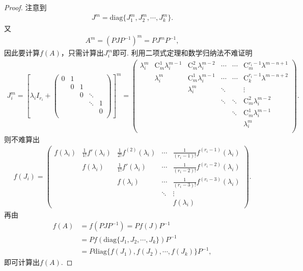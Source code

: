 \documentclass[../../main.tex]{subfiles}
\begin{document}
\begin{proof}
注意到
\begin{align*}
J^m = \mathrm{diag}\{J_1^m,J_2^m,\cdots,J_k^m\}.
\end{align*}
又
\begin{align*}
A^m = (PJP^{-1})^m = PJ^mP^{-1},
\end{align*}
因此要计算\(f(A)\)，只需计算出\(J_i^m\)即可. 
利用二项式定理和数学归纳法不难证明
\begin{align*}
J_{i}^{m}=\left[ \lambda _iI_{r_i}+\left( \begin{matrix}
0&		1&		&		&		\\
&		0&		1&		&		\\
&		&		0&		\ddots&		\\
&		&		&		\ddots&		1\\
&		&		&		&		0\\
\end{matrix} \right) \right] ^m=\left( \begin{matrix}
\lambda _{i}^{m}&		\mathrm{C}_{m}^{1}\lambda _{i}^{m-1}&		\mathrm{C}_{m}^{2}\lambda _{i}^{m-2}&		\cdots&		\cdots&		\mathrm{C}_{m}^{r_i-1}\lambda ^{m-n+1}\\
&		\lambda _{i}^{m}&		\mathrm{C}_{m}^{1}\lambda _{i}^{m-1}&		\cdots&		\cdots&		\mathrm{C}_{k}^{r_i-1}\lambda ^{m-n+2}\\
&		&		\lambda _{i}^{m}&		\ddots&		&		\vdots\\
&		&		&		\ddots&		\ddots&		\mathrm{C}_{m}^{2}\lambda _{i}^{m-2}\\
&		&		&		&		\ddots&		\mathrm{C}_{m}^{1}\lambda _{i}^{m-1}\\
&		&		&		&		&		\lambda _{i}^{m}\\
\end{matrix} \right) .
\end{align*}
则不难算出
\begin{align*}
f(J_i)= \begin{pmatrix}
f(\lambda_i) & \frac{1}{1!}f'(\lambda_i) & \frac{1}{2!}f^{(2)}(\lambda_i) & \cdots & \frac{1}{(r_i - 1)!}f^{(r_i - 1)}(\lambda_i) \\
& f(\lambda_i) & \frac{1}{1!}f'(\lambda_i) & \cdots & \frac{1}{(r_i - 2)!}f^{(r_i - 2)}(\lambda_i) \\
& & f(\lambda_i) & \cdots & \frac{1}{(r_i - 3)!}f^{(r_i - 3)}(\lambda_i) \\
& & & \ddots & \vdots \\
& & & & f(\lambda_i)
\end{pmatrix}. 
\end{align*}
再由
\begin{align*}
f(A) &= f(PJP^{-1}) = Pf(J)P^{-1} \\
&= P f(\mathrm{diag}\{J_1,J_2,\cdots,J_k\})P^{-1} \\
&= P \mathrm{diag}\{f(J_1),f(J_2),\cdots,f(J_k)\}P^{-1},
\end{align*}
即可计算出\(f(A)\). 

\end{proof}
\end{document}
